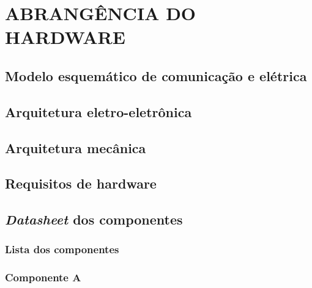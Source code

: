 \chapter{ABRANGÊNCIA DO HARDWARE}
\label{chap:abrhw}

\section{Modelo esquemático de comunicação e elétrica}
\label{sec:modesq}

\section{Arquitetura eletro-eletrônica}
\label{sec:arqelet}

\section{Arquitetura mecânica}
\label{sec:arqmec}

\section{Requisitos de hardware}
\label{sec:reqhw}

\section{\textit{Datasheet} dos componentes}
\label{sec:dtcomp}

\subsection{Lista dos componentes}
\label{sec:lstcomp}

\subsection{Componente A}
\label{sec:comp-a}

